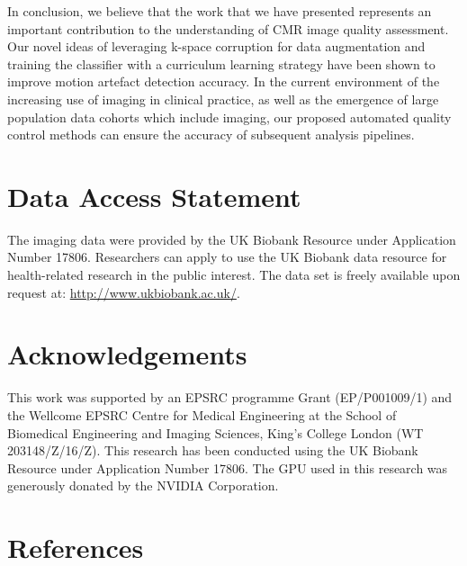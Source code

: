 \documentclass[preprint,12pt,authoryear]{elsarticle}
\begin{document}
In conclusion, we believe that the work that we have presented represents an important contribution to the understanding of CMR image quality assessment. Our novel ideas of leveraging k-space corruption for data augmentation and training the classifier with a curriculum learning strategy have been shown to improve motion artefact detection accuracy.  In the current environment of the increasing use of imaging in clinical practice, as well as the emergence of large population data cohorts which include imaging, our proposed automated quality control methods can ensure the accuracy of subsequent analysis pipelines. 

\section*{Data Access Statement}
The imaging data were provided by the UK Biobank Resource under Application Number 17806. Researchers can apply to use the UK Biobank data resource for health-related research in the public interest. The  data set is freely available upon request at: \url{http://www.ukbiobank.ac.uk/}.

\section*{Acknowledgements}
This work was supported by an EPSRC programme Grant (EP/P001009/1) and the Wellcome EPSRC Centre for Medical Engineering at the School of Biomedical Engineering and Imaging Sciences, King’s College London (WT 203148/Z/16/Z). This research has been conducted using the UK Biobank Resource under Application Number 17806. The GPU used in this research was generously donated by the NVIDIA Corporation.

 
\section*{References}
%

\end{document}
